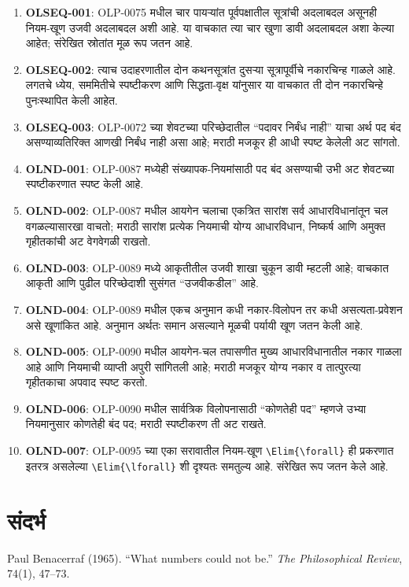 \documentclass[11pt,a4paper,openany]{book}
\theoremstyle{definition}
\begin{document}
\begin{enumerate}
\item \textbf{OLSEQ-001}: OLP-0075 मधील चार पायऱ्यांत पूर्वपक्षातील
सूत्रांची अदलाबदल असूनही नियम-खूण उजवी अदलाबदल अशी आहे. या वाचकात त्या
चार खुणा डावी अदलाबदल अशा केल्या आहेत; संरेखित स्रोतांत मूळ रूप जतन आहे.
\item \textbf{OLSEQ-002}: त्याच उदाहरणातील दोन कथनसूत्रांत दुसऱ्या
सूत्रापूर्वीचे नकारचिन्ह गाळले आहे. लगतचे ध्येय, सममितीचे स्पष्टीकरण आणि
सिद्धता-वृक्ष यांनुसार या वाचकात ती दोन नकारचिन्हे पुनःस्थापित केली आहेत.
\item \textbf{OLSEQ-003}: OLP-0072 च्या शेवटच्या परिच्छेदातील ``पदावर
निर्बंध नाही'' याचा अर्थ पद बंद असण्याव्यतिरिक्त आणखी निर्बंध नाही असा आहे;
मराठी मजकूर ही आधी स्पष्ट केलेली अट सांगतो.
\item \textbf{OLND-001}: OLP-0087 मध्येही संख्यापक-नियमांसाठी पद बंद
असण्याची उभी अट शेवटच्या स्पष्टीकरणात स्पष्ट केली आहे.
\item \textbf{OLND-002}: OLP-0087 मधील आयगेन चलाचा एकत्रित सारांश सर्व
आधारविधानांतून चल वगळल्यासारखा वाचतो; मराठी सारांश प्रत्येक नियमाची योग्य
आधारविधान, निष्कर्ष आणि अमुक्त गृहीतकांची अट वेगवेगळी राखतो.
\item \textbf{OLND-003}: OLP-0089 मध्ये आकृतीतील उजवी शाखा चुकून डावी
म्हटली आहे; वाचकात आकृती आणि पुढील परिच्छेदाशी सुसंगत ``उजवीकडील'' आहे.
\item \textbf{OLND-004}: OLP-0089 मधील एकच अनुमान कधी नकार-विलोपन तर
कधी असत्यता-प्रवेशन असे खूणांकित आहे. अनुमान अर्थतः समान असल्याने मूळची
पर्यायी खूण जतन केली आहे.
\item \textbf{OLND-005}: OLP-0090 मधील आयगेन-चल तपासणीत मुख्य
आधारविधानातील नकार गाळला आहे आणि नियमाची व्याप्ती अपुरी सांगितली आहे;
मराठी मजकूर योग्य नकार व तात्पुरत्या गृहीतकाचा अपवाद स्पष्ट करतो.
\item \textbf{OLND-006}: OLP-0090 मधील सार्वत्रिक विलोपनासाठी ``कोणतेही
पद'' म्हणजे उभ्या नियमानुसार कोणतेही बंद पद; मराठी स्पष्टीकरण ती अट राखते.
\item \textbf{OLND-007}: OLP-0095 च्या एका सरावातील नियम-खूण
\verb|\Elim{\forall}| ही प्रकरणात इतरत्र असलेल्या
\verb|\Elim{\lforall}| शी दृश्यतः समतुल्य आहे. संरेखित रूप जतन केले आहे.
\end{enumerate}
\chapter*{संदर्भ}
\label{bib:Benacerraf1965}
Paul Benacerraf (1965). ``What numbers could not be.''
\textit{The Philosophical Review}, 74(1), 47--73.
\end{document}
